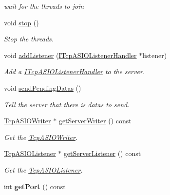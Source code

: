 \begin{DoxyCompactItemize}
\begin{DoxyCompactList}\small\item\em wait for the threads to join \end{DoxyCompactList}\item 
\hypertarget{classmognetwork_1_1_tcp_a_s_i_o_server_aa94340baa5fbbfba0f5467c6ddd32b91}{void \hyperlink{classmognetwork_1_1_tcp_a_s_i_o_server_aa94340baa5fbbfba0f5467c6ddd32b91}{stop} ()}\label{classmognetwork_1_1_tcp_a_s_i_o_server_aa94340baa5fbbfba0f5467c6ddd32b91}

\begin{DoxyCompactList}\small\item\em Stop the threads. \end{DoxyCompactList}\item 
void \hyperlink{classmognetwork_1_1_tcp_a_s_i_o_server_ac1feafc63d86a8aa90ef6a78acd7051f}{add\-Listener} (\hyperlink{classmognetwork_1_1_i_tcp_a_s_i_o_listener_handler}{I\-Tcp\-A\-S\-I\-O\-Listener\-Handler} $\ast$listener)
\begin{DoxyCompactList}\small\item\em Add a \hyperlink{classmognetwork_1_1_i_tcp_a_s_i_o_listener_handler}{I\-Tcp\-A\-S\-I\-O\-Listener\-Handler} to the server. \end{DoxyCompactList}\item 
\hypertarget{classmognetwork_1_1_tcp_a_s_i_o_server_a6627fca52b19ead79e8a7134bade9e1f}{void \hyperlink{classmognetwork_1_1_tcp_a_s_i_o_server_a6627fca52b19ead79e8a7134bade9e1f}{send\-Pending\-Datas} ()}\label{classmognetwork_1_1_tcp_a_s_i_o_server_a6627fca52b19ead79e8a7134bade9e1f}

\begin{DoxyCompactList}\small\item\em Tell the server that there is datas to send. \end{DoxyCompactList}\item 
\hyperlink{classmognetwork_1_1_tcp_a_s_i_o_writer}{Tcp\-A\-S\-I\-O\-Writer} $\ast$ \hyperlink{classmognetwork_1_1_tcp_a_s_i_o_server_a55e84839aad1572d36a0c7fcbc1fd84d}{get\-Server\-Writer} () const 
\begin{DoxyCompactList}\small\item\em Get the \hyperlink{classmognetwork_1_1_tcp_a_s_i_o_writer}{Tcp\-A\-S\-I\-O\-Writer}. \end{DoxyCompactList}\item 
\hyperlink{classmognetwork_1_1_tcp_a_s_i_o_listener}{Tcp\-A\-S\-I\-O\-Listener} $\ast$ \hyperlink{classmognetwork_1_1_tcp_a_s_i_o_server_afb30f505e64de27887abec2e8cfd50ff}{get\-Server\-Listener} () const 
\begin{DoxyCompactList}\small\item\em Get the \hyperlink{classmognetwork_1_1_tcp_a_s_i_o_listener}{Tcp\-A\-S\-I\-O\-Listener}. \end{DoxyCompactList}\item 
\hypertarget{classmognetwork_1_1_tcp_a_s_i_o_server_a2f16d1d17fa0924ae3374b5a0b2ddbb9}{int {\bfseries get\-Port} () const }\label{classmognetwork_1_1_tcp_a_s_i_o_server_a2f16d1d17fa0924ae3374b5a0b2ddbb9}


\end{DoxyCompactItemize}
